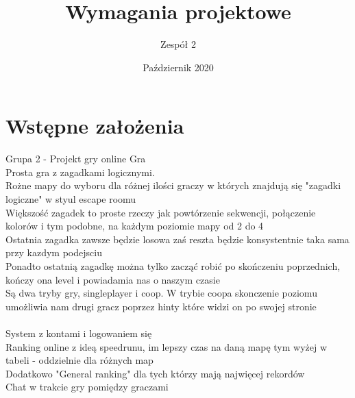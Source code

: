 \documentclass{article}
\title{Wymagania projektowe}
\author{Zespół 2}
\date{Październik 2020}
\begin{document}
\maketitle

\section{Wstępne założenia}
Grupa 2 - Projekt gry online Gra\\
Prosta gra z zagadkami logicznymi.\\
Rożne mapy do wyboru dla różnej ilości graczy w których znajdują się "zagadki logiczne" w styul escape roomu\\
Większość zagadek to proste rzeczy jak powtórzenie sekwencji, połączenie kolorów i tym podobne, na każdym poziomie mapy od 2 do 4\\
Ostatnia zagadka zawsze będzie losowa zaś reszta będzie konsystentnie taka sama przy kazdym podejsciu \\
Ponadto ostatnią zagadkę można tylko zacząć robić po skończeniu poprzednich, kończy ona level i powiadamia nas o naszym czasie \\
Są dwa tryby gry, singleplayer i coop. W trybie coopa skonczenie poziomu umożliwia nam drugi gracz poprzez hinty które widzi on po swojej stronie\\\\

System z kontami i logowaniem się\\
Ranking online z ideą speedrunu, im lepszy czas na daną mapę tym wyżej w tabeli - oddzielnie dla różnych map\\
Dodatkowo "General ranking" dla tych którzy mają najwięcej rekordów \\
Chat w trakcie gry pomiędzy graczami
\end{document}
